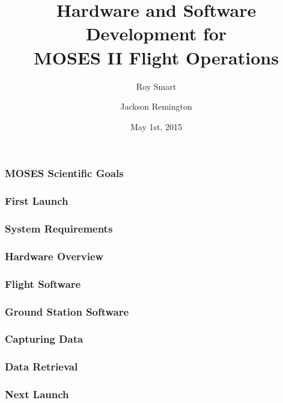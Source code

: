 \documentclass[landscape,xcolor={table}]{beamer}
\title[...]{Hardware and Software Development for \\ MOSES II Flight Operations}
\author[Smart, Mashburn]{Roy Smart \and Jackson Remington}
\institute{Montana State University}
\date{May 1st, 2015}
\begin{document}
	\begin{frame}[plain]
	        \titlepage
	\end{frame}
	
	\begin{frame}
		
		\frametitle{MOSES Scientific Goals}

	\end{frame}
	
	\begin{frame}
		
		\frametitle{First Launch}

	\end{frame}

	\begin{frame}
		
		\frametitle{System Requirements}

	\end{frame}
	
	\begin{frame}
		
		\frametitle{Hardware Overview}

	\end{frame}
	
	\begin{frame}
		
		\frametitle{Flight Software}

	\end{frame}
	
	\begin{frame}
		
		\frametitle{Ground Station Software}

	\end{frame}
	
	\begin{frame}
		
		\frametitle{Capturing Data}

	\end{frame}
	
	\begin{frame}
		
		\frametitle{Data Retrieval}

	\end{frame}
	
	\begin{frame}
		
		\frametitle{Next Launch}

	\end{frame}
	
\end{document}
